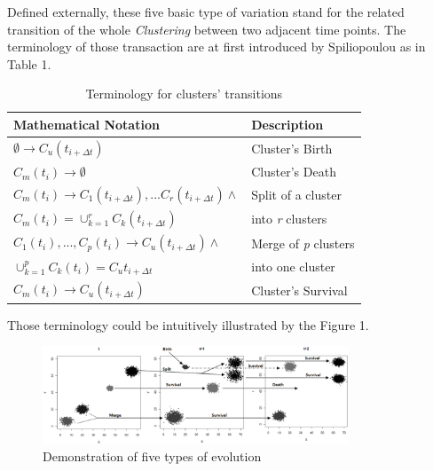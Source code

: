 \documentclass{sig-alternate-05-2015}
\begin{document}
Defined externally, these five basic type of variation stand for the related transition of the whole \emph{Clustering} between two adjacent time points. The terminology of those transaction are at first introduced by Spiliopoulou\cite{SPILIOPOULOU:transition} as in Table 1.
\begin{table}
  \centering
  \caption{Terminology for clusters' transitions}
  \begin{tabular}{|l|l|}
    \hline
    \textbf{Mathematical Notation} & \textbf{Description} \\ \hline
    $\emptyset\rightarrow C_u(t_{i+\Delta t})$ & Cluster's Birth \\ \hline

    $C_m(t_i)\rightarrow\emptyset$ & Cluster's Death \\ \hline

    $C_m(t_i)\rightarrow{C_1(t_{i+\Delta t}),...C_r(t_{i+\Delta t})}\land$ & Split of a cluster \\
    $C_m(t_i)=\cup_{k=1}^rC_k(t_{i+\Delta t})$ & into \emph{r} clusters \\ \hline

    ${C_1(t_i),...,C_p(t_i)}\rightarrow C_u(t_{i+\Delta t})\land$ & Merge of \emph{p} clusters \\
    $\cup_{k=1}^pC_k(t_i)=C_u{t_{i+\Delta t}}$ & into one cluster \\ \hline

    $C_m(t_i)\rightarrow C_u(t_{i+\Delta t})$ & Cluster's Survival \\ \hline
  \end{tabular}
\end{table}

Those terminology could be intuitively illustrated by the Figure 1.

\begin{figure}
  \centering
  \includegraphics[height=1.15in]{evolution}
  \caption{Demonstration of five types of evolution}
\end{figure}
\end{document}
